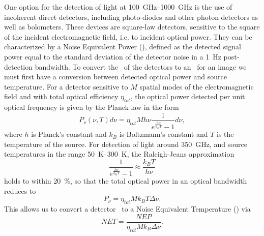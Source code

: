 One option for the detection of light at \SIrange{100}{1000}{\GHz} is the use of incoherent direct detectors, including photo-diodes and other photon detectors as well as bolometers.
These devices are square-law detectors, sensitive to the square of the incident electromagnetic field, i.e. to incident optical power.
They can be characterized by a Noise Equivalent Power (\NEP), defined as the detected signal power equal to the standard deviation of the detector noise in a \SI{1}{\Hz} post-detection bandwidth.
To convert the \NEP\ of the detectors to an \NETD\ for an image we must first have a conversion between detected optical power and source temperature.
For a detector sensitive to $M$ spatial modes of the electromagnetic field and with total optical efficiency $\eta_{tot}$, the optical power detected per unit optical frequency is given by the Planck law in the form \cite{richards_bolometers_1994}
\begin{equation} \label{eqn:ch1-planck}
  P_{\nu}(\nu,T) d \nu = \eta_{tot} M h \nu \frac{1}{e^{\frac{h \nu}{k_B T}} - 1} d \nu,
\end{equation}
where $h$ is Planck's constant and $k_B$ is Boltzmann's constant and $T$ is the temperature of the source.
For detection of light around \SI{350}{\GHz}, and source temperatures in the range \SIrange{50}{300}{\K}, the Raleigh-Jeans approximation
\begin{equation}
  \frac{1}{e^{\frac{h \nu}{k_B T}} - 1} \approx \frac{k_B T}{h \nu}
\end{equation}
holds to within \SI{20}{\percent}, so that the total optical power in an optical bandwidth reduces to 
\begin{equation}
  P_{\nu} = \eta_{tot} M k_B T \Delta \nu.
\end{equation}
This allows us to convert a detector \NEP\ to a Noise Equivalent Temperature (\NET) via
\begin{equation}
  NET = \frac{NEP}{\eta_{tot} M k_B \Delta \nu}.
\end{equation}

